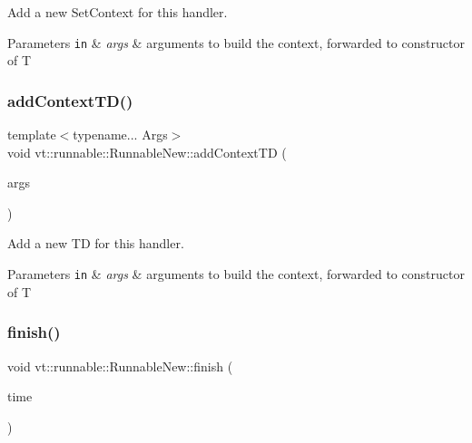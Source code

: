 Add a new {\ttfamily Set\+Context} for this handler. 


\begin{DoxyParams}[1]{Parameters}
\mbox{\tt in}  & {\em args} & arguments to build the context, forwarded to constructor of {\ttfamily T} \\
\hline
\end{DoxyParams}
\mbox{\label{structvt_1_1runnable_1_1_runnable_new_ac2480a813d1adc735051314093b91e1d}} 
\subsubsection{\texorpdfstring{add\+Context\+T\+D()}{addContextTD()}}
{\footnotesize\ttfamily template$<$typename... Args$>$ \\
void vt\+::runnable\+::\+Runnable\+New\+::add\+Context\+TD (\begin{DoxyParamCaption}\item[{Args \&\&...}]{args }\end{DoxyParamCaption})}



Add a new {\ttfamily TD} for this handler. 


\begin{DoxyParams}[1]{Parameters}
\mbox{\tt in}  & {\em args} & arguments to build the context, forwarded to constructor of {\ttfamily T} \\
\hline
\end{DoxyParams}
\mbox{\label{structvt_1_1runnable_1_1_runnable_new_a089297ae1be6e7bf33ae28611b12db17}} 
\subsubsection{\texorpdfstring{finish()}{finish()}}
{\footnotesize\ttfamily void vt\+::runnable\+::\+Runnable\+New\+::finish (\begin{DoxyParamCaption}\item[{\hyperlink{namespacevt_a2b9f28078dc309ad0706b69ded743e69}{Time\+Type}}]{time }\end{DoxyParamCaption})\hspace{0.3cm}{\ttfamily [private]}}



